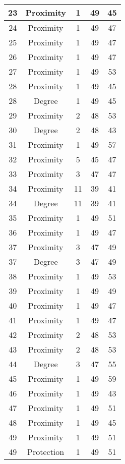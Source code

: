 \documentclass[results.tex]{subfiles}
\begin{document}
\begin{center}
\begin{tabular}{| c || c | c | c | c |}
    \hline
    23 & Proximity & 1 & 49 & 45 \\ 
    \hline
    24 & Proximity & 1 & 49 & 47 \\ 
    \hline
    25 & Proximity & 1 & 49 & 47 \\ 
    \hline
    26 & Proximity & 1 & 49 & 47 \\ 
    \hline
    27 & Proximity & 1 & 49 & 53 \\ 
    \hline
    28 & Proximity & 1 & 49 & 45 \\ 
    \hline
    28 & Degree & 1 & 49 & 45 \\ 
    \hline
    29 & Proximity & 2 & 48 & 53 \\ 
    \hline
    30 & Degree & 2 & 48 & 43 \\ 
    \hline
    31 & Proximity & 1 & 49 & 57 \\ 
    \hline
    32 & Proximity & 5 & 45 & 47 \\ 
    \hline
    33 & Proximity & 3 & 47 & 47 \\ 
    \hline
    34 & Proximity & 11 & 39 & 41 \\ 
    \hline
    34 & Degree & 11 & 39 & 41 \\ 
    \hline
    35 & Proximity & 1 & 49 & 51 \\ 
    \hline
    36 & Proximity & 1 & 49 & 47 \\ 
    \hline
    37 & Proximity & 3 & 47 & 49 \\ 
    \hline
    37 & Degree & 3 & 47 & 49 \\ 
    \hline
    38 & Proximity & 1 & 49 & 53 \\ 
    \hline
    39 & Proximity & 1 & 49 & 49 \\ 
    \hline
    40 & Proximity & 1 & 49 & 47 \\ 
    \hline
    41 & Proximity & 1 & 49 & 47 \\ 
    \hline
    42 & Proximity & 2 & 48 & 53 \\ 
    \hline
    43 & Proximity & 2 & 48 & 53 \\ 
    \hline
    44 & Degree & 3 & 47 & 55 \\ 
    \hline
    45 & Proximity & 1 & 49 & 59 \\ 
    \hline
    46 & Proximity & 1 & 49 & 43 \\ 
    \hline
    47 & Proximity & 1 & 49 & 51 \\ 
    \hline
    48 & Proximity & 1 & 49 & 45 \\ 
    \hline
    49 & Proximity & 1 & 49 & 51 \\ 
    \hline
    49 & Protection & 1 & 49 & 51 \\ 
    \hline   \end{tabular}
\end{center}
\end{document}
